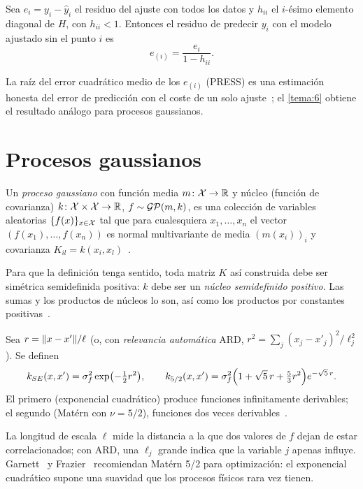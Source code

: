 \begin{proposicion}\label{prop:loo-lineal}
Sea $e_i=y_i-\hat y_i$ el residuo del ajuste con todos los datos y $h_{ii}$ el $i$-ésimo elemento diagonal de $H$, con $h_{ii}<1$. Entonces el residuo de predecir $y_i$ con el modelo ajustado sin el punto $i$ es
\[
e_{(i)}=\frac{e_i}{1-h_{ii}} .
\]
\end{proposicion}

La raíz del error cuadrático medio de los $e_{(i)}$ (PRESS) es una estimación honesta del error de predicción con el coste de un solo ajuste~\cite[§14.5]{kw}; el \cref{tema:6} obtiene el resultado análogo para procesos gaussianos.

\section{Procesos gaussianos}

\begin{definicion}\label{def:gp}
Un \emph{proceso gaussiano} con función media $m\colon\mathcal{X}\to\mathbb{R}$ y núcleo (función de covarianza) $k\colon\mathcal{X}\times\mathcal{X}\to\mathbb{R}$, $f\sim\mathcal{GP}(m,k)$, es una colección de variables aleatorias $\{f(x)\}_{x\in\mathcal{X}}$ tal que para cualesquiera $x_1,\dots,x_n$ el vector $(f(x_1),\dots,f(x_n))$ es normal multivariante de media $(m(x_i))_i$ y covarianza $K_{il}=k(x_i,x_l)$~\cite[cap.~2]{rw}.
\end{definicion}

Para que la definición tenga sentido, toda matriz $K$ así construida debe ser simétrica semidefinida positiva: $k$ debe ser un \emph{núcleo semidefinido positivo}. Las sumas y los productos de núcleos lo son, así como los productos por constantes positivas~\cite[cap.~4]{rw}.

\begin{definicion}\label{def:nucleos}
Sea $r=\lVert x-x'\rVert/\ell$ (o, con \emph{relevancia automática} ARD, $r^2=\sum_j(x_j-x'_j)^2/\ell_j^2$). Se definen
\[
k_{SE}(x,x')=\sigma_f^2\exp\bigl(-\tfrac12r^2\bigr),\qquad
k_{5/2}(x,x')=\sigma_f^2\Bigl(1+\sqrt5\,r+\tfrac53r^2\Bigr)e^{-\sqrt5\,r}.
\]
El primero (exponencial cuadrático) produce funciones infinitamente derivables; el segundo (Matérn con $\nu=5/2$), funciones dos veces derivables~\cite[cap.~4]{rw}.
\end{definicion}

La longitud de escala $\ell$ mide la distancia a la que dos valores de $f$ dejan de estar correlacionados; con ARD, una $\ell_j$ grande indica que la variable $j$ apenas influye. Garnett~\cite[§3.3]{garnett} y Frazier~\cite[§3.1]{frazier} recomiendan Matérn 5/2 para optimización: el exponencial cuadrático supone una suavidad que los procesos físicos rara vez tienen.

